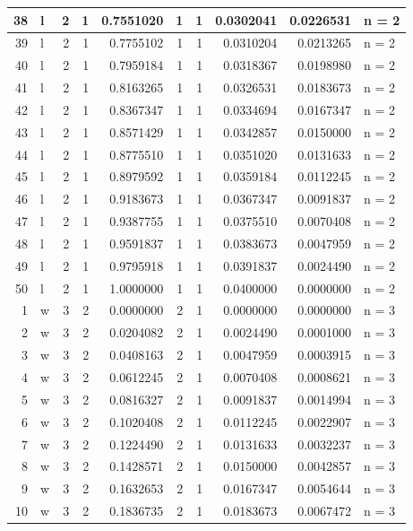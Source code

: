 \documentclass[
  letterpaper,
  DIV=11,
  numbers=noendperiod]{scrreprt}
\begin{document}
\begin{table}
\begin{tabular}[t]{r|l|r|r|r|r|r|r|r|l}
\hline
38 & l & 2 & 1 & 0.7551020 & 1 & 1 & 0.0302041 & 0.0226531 & n = 2\\
\hline
39 & l & 2 & 1 & 0.7755102 & 1 & 1 & 0.0310204 & 0.0213265 & n = 2\\
\hline
40 & l & 2 & 1 & 0.7959184 & 1 & 1 & 0.0318367 & 0.0198980 & n = 2\\
\hline
41 & l & 2 & 1 & 0.8163265 & 1 & 1 & 0.0326531 & 0.0183673 & n = 2\\
\hline
42 & l & 2 & 1 & 0.8367347 & 1 & 1 & 0.0334694 & 0.0167347 & n = 2\\
\hline
43 & l & 2 & 1 & 0.8571429 & 1 & 1 & 0.0342857 & 0.0150000 & n = 2\\
\hline
44 & l & 2 & 1 & 0.8775510 & 1 & 1 & 0.0351020 & 0.0131633 & n = 2\\
\hline
45 & l & 2 & 1 & 0.8979592 & 1 & 1 & 0.0359184 & 0.0112245 & n = 2\\
\hline
46 & l & 2 & 1 & 0.9183673 & 1 & 1 & 0.0367347 & 0.0091837 & n = 2\\
\hline
47 & l & 2 & 1 & 0.9387755 & 1 & 1 & 0.0375510 & 0.0070408 & n = 2\\
\hline
48 & l & 2 & 1 & 0.9591837 & 1 & 1 & 0.0383673 & 0.0047959 & n = 2\\
\hline
49 & l & 2 & 1 & 0.9795918 & 1 & 1 & 0.0391837 & 0.0024490 & n = 2\\
\hline
50 & l & 2 & 1 & 1.0000000 & 1 & 1 & 0.0400000 & 0.0000000 & n = 2\\
\hline
1 & w & 3 & 2 & 0.0000000 & 2 & 1 & 0.0000000 & 0.0000000 & n = 3\\
\hline
2 & w & 3 & 2 & 0.0204082 & 2 & 1 & 0.0024490 & 0.0001000 & n = 3\\
\hline
3 & w & 3 & 2 & 0.0408163 & 2 & 1 & 0.0047959 & 0.0003915 & n = 3\\
\hline
4 & w & 3 & 2 & 0.0612245 & 2 & 1 & 0.0070408 & 0.0008621 & n = 3\\
\hline
5 & w & 3 & 2 & 0.0816327 & 2 & 1 & 0.0091837 & 0.0014994 & n = 3\\
\hline
6 & w & 3 & 2 & 0.1020408 & 2 & 1 & 0.0112245 & 0.0022907 & n = 3\\
\hline
7 & w & 3 & 2 & 0.1224490 & 2 & 1 & 0.0131633 & 0.0032237 & n = 3\\
\hline
8 & w & 3 & 2 & 0.1428571 & 2 & 1 & 0.0150000 & 0.0042857 & n = 3\\
\hline
9 & w & 3 & 2 & 0.1632653 & 2 & 1 & 0.0167347 & 0.0054644 & n = 3\\
\hline
10 & w & 3 & 2 & 0.1836735 & 2 & 1 & 0.0183673 & 0.0067472 & n = 3\\

\end{tabular}
\end{table}
\end{document}
